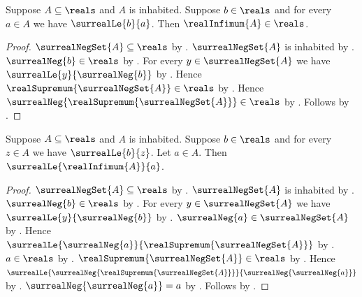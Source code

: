\begin{theorem}\label{real_infimum_is_real}
    Suppose $A\subseteq\reals$ and $A$ is inhabited.
    Suppose $b\in\reals$ and for every $a\in A$ we have
        $\surrealLe{b}{a}$.
    Then $\realInfimum{A}\in\reals$.
\end{theorem}
\begin{proof}
    $\surrealNegSet{A}\subseteq\reals$ by
        .
    $\surrealNegSet{A}$ is inhabited by
        .
    $\surrealNeg{b}\in\reals$ by
        .
    For every $y\in\surrealNegSet{A}$ we have
        $\surrealLe{y}{\surrealNeg{b}}$ by
        .
    Hence $\realSupremum{\surrealNegSet{A}}\in\reals$ by
        .
    Hence $\surrealNeg{\realSupremum{\surrealNegSet{A}}}\in\reals$ by
        .
    Follows by .
\end{proof}

\begin{theorem}\label{real_infimum_lower_bound}
    Suppose $A\subseteq\reals$ and $A$ is inhabited.
    Suppose $b\in\reals$ and for every $z\in A$ we have
        $\surrealLe{b}{z}$.
    Let $a\in A$.
    Then $\surrealLe{\realInfimum{A}}{a}$.
\end{theorem}
\begin{proof}
    $\surrealNegSet{A}\subseteq\reals$ by
        .
    $\surrealNegSet{A}$ is inhabited by
        .
    $\surrealNeg{b}\in\reals$ by
        .
    For every $y\in\surrealNegSet{A}$ we have
        $\surrealLe{y}{\surrealNeg{b}}$ by
        .
    $\surrealNeg{a}\in\surrealNegSet{A}$ by
        .
    Hence $\surrealLe{\surrealNeg{a}}
        {\realSupremum{\surrealNegSet{A}}}$ by
        .
    $a\in\reals$ by .
    $\realSupremum{\surrealNegSet{A}}\in\reals$ by
        .
    Hence $\surrealLe
        {\surrealNeg{\realSupremum{\surrealNegSet{A}}}}
        {\surrealNeg{\surrealNeg{a}}}$ by
        .
    $\surrealNeg{\surrealNeg{a}}=a$ by
        .
    Follows by .
\end{proof}

